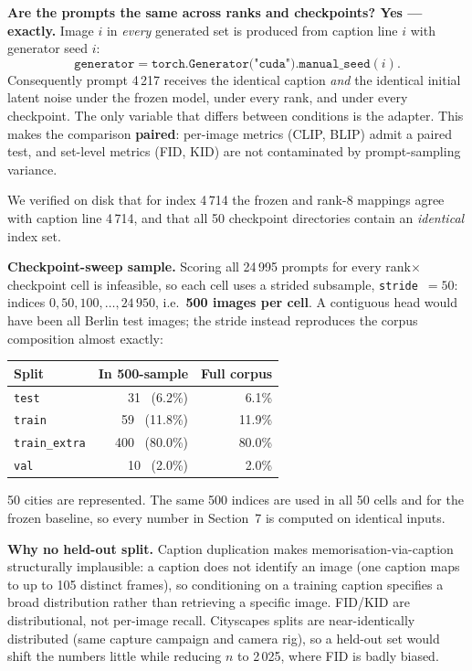 \documentclass[11pt,a4paper]{article}
\begin{document}
\textbf{Are the prompts the same across ranks and checkpoints? Yes --- exactly.}
Image $i$ in \emph{every} generated set is produced from caption line $i$ with
generator seed $i$:
\[
\texttt{generator} = \texttt{torch.Generator("cuda").manual\_seed}(i).
\]
Consequently prompt 4\,217 receives the identical caption \emph{and} the
identical initial latent noise under the frozen model, under every rank, and
under every checkpoint. The only variable that differs between conditions is the
adapter. This makes the comparison \textbf{paired}: per-image metrics
(CLIP, BLIP) admit a paired test, and set-level metrics (FID, KID) are not
contaminated by prompt-sampling variance.

We verified on disk that for index 4\,714 the frozen and rank-8 mappings agree
with caption line 4\,714, and that all 50 checkpoint directories contain an
\emph{identical} index set.

\textbf{Checkpoint-sweep sample.} Scoring all 24\,995 prompts for every
rank$\times$checkpoint cell is infeasible, so each cell uses a strided
subsample, \texttt{stride}~$=50$: indices $0, 50, 100, \dots, 24\,950$, i.e.\
\textbf{500 images per cell}. A contiguous head would have been all Berlin
test images; the stride instead reproduces the corpus composition almost exactly:

\begin{center}\small
\begin{tabular}{lrr}
\toprule
Split & In 500-sample & Full corpus \\
\midrule
\texttt{test} & 31 \ (6.2\%) & 6.1\% \\
\texttt{train} & 59 \ (11.8\%) & 11.9\% \\
\texttt{train\_extra} & 400 \ (80.0\%) & 80.0\% \\
\texttt{val} & 10 \ (2.0\%) & 2.0\% \\
\bottomrule
\end{tabular}
\end{center}

50 cities are represented. The same 500 indices are used in all 50 cells and for
the frozen baseline, so every number in Section~7 is computed on identical inputs.

\textbf{Why no held-out split.} Caption duplication makes
memorisation-via-caption structurally implausible: a caption does not identify an
image (one caption maps to up to 105 distinct frames), so conditioning on a
training caption specifies a broad distribution rather than retrieving a specific
image. FID/KID are distributional, not per-image recall. Cityscapes splits are
near-identically distributed (same capture campaign and camera rig), so a
held-out set would shift the numbers little while reducing $n$ to 2\,025, where
FID is badly biased.
\end{document}
